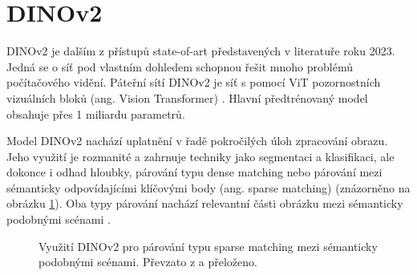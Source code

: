 \section{DINOv2}
\label{sec:Chapter27}

DINOv2 je dalším z přístupů state-of-art představených v literatuře \cite{dinov2} roku 2023. Jedná se o síť pod vlastním dohledem schopnou řešit mnoho problémů počítačového vidění. Páteřní sítí DINOv2 je síť s pomocí ViT pozornostních vizuálních bloků (ang. Vision Transformer) \cite{vit}. Hlavní předtrénovaný model obsahuje přes 1 miliardu parametrů.

Model DINOv2 nachází uplatnění v řadě pokročilých úloh zpracování obrazu. Jeho využití je rozmanité a zahrnuje techniky jako segmentaci a klasifikaci, ale dokonce i odhad hloubky, párování typu dense matching nebo párování mezi sémanticky odpovídajícími klíčovými body (ang. sparse matching) (znázorněno na obrázku \ref{fig:dinov2_sparse_matching}). Oba typy párování nachází relevantní části obrázku mezi sémanticky podobnými scénami \cite{dinov2.metademolab.com}.

\begin{figure}[H]
\centering

\newcommand{\subfiguresize}{.15\textwidth}
\newcommand{\imagewidth}{1.0in}
\newcommand{\hspacesize}{.43in}

\newcommand{\insertimage}[1]{%
  \begin{minipage}{\imagewidth}
    \centering
    \texttt{[image: \#1]}
  \end{minipage}
}

\hspace{\hspacesize}%

\caption[Využití DINOv2 pro párování typu sparse matching]
{Využití DINOv2 pro párování typu sparse matching mezi sémanticky podobnými scénami. Převzato z \cite{dinov2} a přeloženo.}
\label{fig:dinov2_sparse_matching}
\end{figure}

\endinput